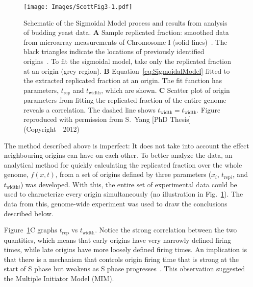 {	\begin{figure}[tbh]
		\begin{center}
			\texttt{[image: Images/ScottFig3-1.pdf]}
		\end{center}
			\caption[Sigmoidal model]{\label{fig:SigmoidalModel} Schematic of the Sigmoidal Model process and results from analysis of budding yeast data.
				\textbf{A} Sample replicated fraction: smoothed data from microarray measurements of Chromosome I (solid lines)~\cite{McCuneMicroArray}.
				The black triangles indicate the locations of previously identified origins~\cite{OriginLocations}.
				To fit the sigmoidal model, take only the replicated fraction at an origin (grey region).
				\textbf{B} Equation~\ref{eq:SigmoidalModel} fitted to the extracted replicated fraction at an origin.
				The fit function has parameters, $t_{\text{rep}}$ and $t_{\text{width}}$, which are shown.
				\textbf{C} Scatter plot of origin parameters from fitting the replicated fraction of the entire genome reveals a correlation.%
				The dashed line shows $t_{\text{width}}=t_{\text{width}}$.
				Figure reproduced with permission from S.~Yang [PhD Thesis]~\cite{ScottsThesis} (Copyright~\textcopyright~2012)}
	\end{figure}
	
	The method described above is imperfect: It does not take into account the effect neighbouring origins can have on each other.
	To better analyze the data, an analytical method for quickly calculating the replicated fraction over the whole genome, $f(x,t)$, from a set of origins defined by three parameters ($x_i$, $t_{\text{rep}i}$, and $t_{\text{width}i}$) was developed.
	With this, the entire set of experimental data could be used to characterize every origin simultaneously (no illustration in Fig.~\ref{fig:SigmoidalModel}).
	The data from this, genome-wide experiment was used to draw the conclusions described below.
	
	Figure~\ref{fig:SigmoidalModel}C graphs $t_{\text{rep}}$ vs $t_{\text{width}}$.
	Notice the strong correlation between the two quantities, which means that early origins have very narrowly defined firing times, while late origins have more loosely defined firing times.
	An implication is that there is a mechanism that controls origin firing time that is strong at the start of S phase but weakens as S phase progresses~\cite{ScottsThesis}.
	This observation suggested the Multiple Initiator Model (MIM).
\clearpage
	
}
